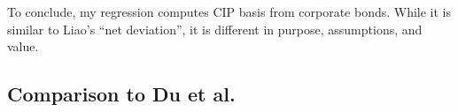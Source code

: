 % 


To conclude, my regression computes CIP basis from corporate bonds.  While it is similar to Liao's ``net deviation'', it is different in purpose, assumptions, and value.




\subsection{Comparison to Du et al.}

